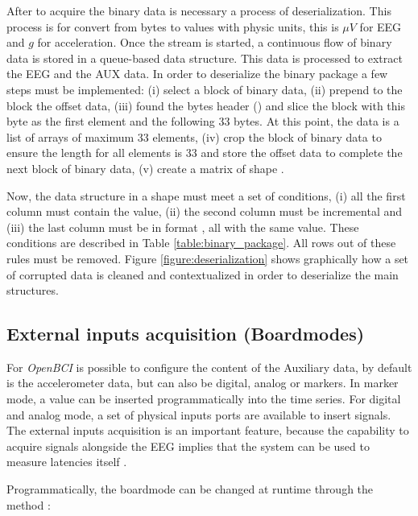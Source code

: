 After to acquire the binary data is necessary a process of deserialization. This process is for convert from bytes to values with physic units, this is $\mu V$ for EEG and $g$ for acceleration. Once the stream is started, a continuous flow of binary data is stored in a queue-based data structure. This data is processed to extract the EEG and the AUX data. In order to deserialize the binary package a few steps must be implemented:
(i) select a block of binary data,
(ii) prepend to the block the offset data,
(iii) found the bytes header () and slice the block with this byte as the first element and the following 33 bytes. At this point, the data is a list of arrays of maximum 33 elements,
(iv) crop the block of binary data to ensure the length for all elements is 33 and store the offset data to complete the next block of binary data,
(v) create a matrix of shape .

Now, the data structure in a shape  must meet a set of conditions, (i) all the first column must contain the  value, (ii) the second column must be incremental and (iii) the last column must be in format , all with the same value. These conditions are described in Table \ref{table:binary_package}. All rows out of these rules must be removed. Figure \ref{figure:deserialization} shows graphically how a set of corrupted data is cleaned and contextualized in order to deserialize the main structures.

\subsection{External inputs acquisition (Boardmodes)}\label{subsec:boardmodes}

For \textit{OpenBCI} is possible to configure the content of the Auxiliary data, by default is the accelerometer data, but can also be digital, analog or markers. In marker mode, a value can be inserted programmatically into the time series. For digital and analog mode, a set of physical inputs ports are available to insert signals. The external inputs acquisition is an important feature, because the capability to acquire signals alongside the EEG implies that the system can be used to measure latencies itself \cite{wilson2010procedure}.

Programmatically, the boardmode can be changed at runtime through the method :



